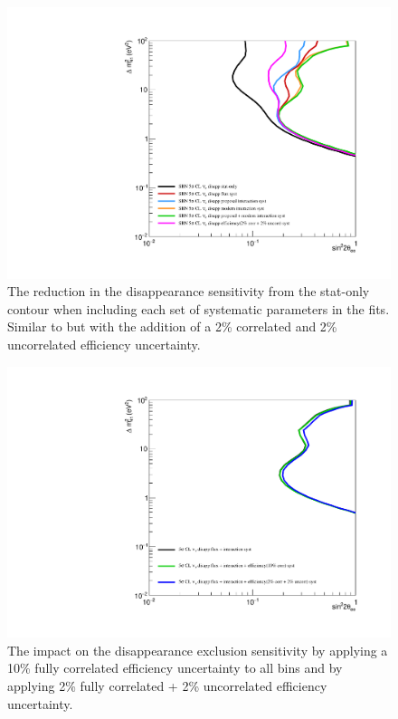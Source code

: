 \begin{figure}[h!]
    \centering
    \includegraphics[width = \largefigwidth]{figures-chap6/exclusion_contours/nue_disapp_syst_groups+det.pdf}
     \caption[\nue disapp sensitivity reduction from different systematic groups with a (2+2)\% efficiency uncertainty.]{The reduction in the \nue disappearance sensitivity from the stat-only contour when including each set of systematic parameters in the fits. Similar to  but with the addition of a 2\% correlated and 2\% uncorrelated efficiency uncertainty.}
    \label{fig:nue_disapp_syst_groups_detector}
\end{figure}

\begin{figure}[h!]
    \centering
    \includegraphics[width = \largefigwidth]{figures-chap6/exclusion_contours/efficiency_systematics/nue_disapp_cor_uncor.pdf}
    \caption[Impact of correlated and uncorrelated efficiency systematics on the \nue disappearance sensitivity.]{The impact on the \nue disappearance exclusion sensitivity by applying a 10\% fully correlated efficiency uncertainty to all bins and by applying 2\% fully correlated + 2\% uncorrelated efficiency uncertainty.}
    \label{fig:my_label}
\end{figure}

